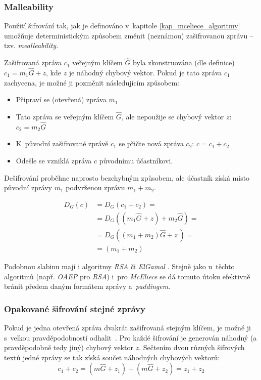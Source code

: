 \documentclass[thesis=M,czech,hidelinks]{FITthesis}[2012/06/26]
\newcommand{\0}{{\textcolor[gray]{0.80}{0}}}
\begin{document}
\subsubsection{Malleability}

Použití šifrování tak, jak je definováno v~kapitole \ref{kap_mceliece_algoritmy}
umožňuje deterministickým způsobem změnit (neznámou) zašifrovanou zprávu -- tzv.
\emph{mealleability}.

Zašifrovaná zpráva $c_1$ veřejným klíčem $\hat{G}$ byla zkonstruována (dle
definice) $c_1 = m_1\hat{G} + z$, kde $z$ je náhodný chybový vektor. Pokud je
tato zpráva $c_1$ zachycena, je možné ji pozměnit následujícím způsobem:

\begin{itemize}
    \item Připraví se (otevřená) zpráva $m_1$
    \item Tato zpráva se  veřejným klíčem $\hat{G}$, ale nepoužije
        se chybový vektor $z$: $c_2 = m_2\hat{G}$
    \item K~původní zašifrované zprávě $c_1$ se přičte nová zpráva $c_2$:
        $c = c_1 + c_2$
    \item Odešle se vzniklá zpráva $c$ původnímu účastníkovi.
\end{itemize}

Dešifrování proběhne naprosto bezchybným způsobem, ale účastník získá místo
původní zprávy $m_1$ podvrženou zprávu $m_1+m_2$.

\begin{align*}
    D_G\left(c\right) &= D_G\left( c_1 + c_2 \right) = \\
                      &= D_G\left( (m_1\hat{G} + z) + m_2\hat{G} \right) = \\
                      &= D_G\left( (m_1+m_2)\hat{G} + z~\right) =\\
                      &= (m_1+m_2)
\end{align*}

Podobnou slabinu mají i algoritmy \emph{RSA} či \emph{ElGamal} \cite{FIT_KRY}.
Stejně jako u~těchto algoritmů (např. \emph{OAEP} pro \emph{RSA}) i~pro
\emph{McEliece} se dá tomuto útoku efektivně bránit předem daným formátem zprávy
a~\emph{paddingem}.

\subsubsection{Opakované šifrování stejné zprávy}

Pokud je jedna otevřená zpráva dvakrát zašifrovaná stejným klíčem, je možné ji
s~velkou pravděpodobností odhalit~\cite{Berson}. Pro každé šifrování je
generován náhodný (a pravděpodobně tedy jiný) chybový vektor $z$. Sečtením dvou
různých šifrových textů jedné zprávy se tak získá součet náhodných chybových
vektorů:
$$ c_1 + c_2 = (m\hat{G} + z_1) + (m\hat{G} + z_2) = z_1 + z_2 $$
\end{document}
